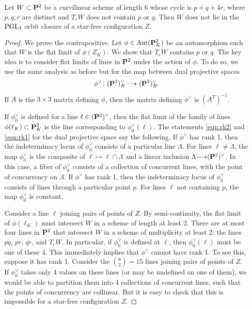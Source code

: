 \documentclass[12pt,reqno]{amsart}
\renewcommand{\to}{{\longrightarrow}}
\numberwithin{equation}{section}
\begin{document}
\begin{proposition}\label{prop:pq4r}
  Let $W \subset \P^2$ be a curvilinear scheme of length 6 whose cycle is $p + q + 4r$, where $p,q,r$ are distinct and $T_rW$ does not contain $p$ or $q$.
  Then $W$ does not lie in the $\PGL_3$ orbit closure of a star-free configuration $Z$.
\end{proposition}
\begin{proof}
  We prove the contrapositive.
  Let $\phi \in \Aut(\P^2_K)$ be an automorphism such that $W$ is the flat limit of $\phi(Z_K)$.
  We show that $T_r W$ contains $p$ or $q$.
  The key idea is to consider flat limits of lines in $\P^2$ under the action of $\phi$.
  To do so, we use the same analysis as before but for the map between dual projective spaces
  \[\phi^\vee \colon (\P^2)_R^\vee \dashrightarrow (\P^2)_R^\vee.\]
  If $A$ is the $3 \times 3$ matrix defining $\phi$, then the matrix defining $\phi^\vee$ is $(A^T)^{-1}$.

  If $\phi_0^\vee$ is defined for a line $\ell \in (\P^2)^\vee$, then the flat limit of the family of lines $\phi(\ell_K) \subset \P^2_K$ is the line corresponding to $\phi_0^\vee(\ell)$.
  The statements \eqref{eqn:rk2} and \eqref{eqn:rk1} for the dual projective space say the following.
  If $\phi^\vee$ has rank 1, then the indeterminacy locus of $\phi^\vee_0$ consists of a particular line $\Lambda$.
  For lines $\ell \neq \Lambda$, the map $\phi_0^\vee$ is the composite of $\ell \mapsto \ell \cap \Lambda$ and a linear inclusion $\Lambda \to (\P^2)^\vee$.
  In this case, a fiber of $\phi_0^\vee$ consists of a collection of concurrent lines, with the point of concurrency on $\Lambda$.
  If $\phi^\vee$ has rank 1, then the indeterminacy locus of $\phi^\vee_0$ consists of lines through a particular point $p$.
  For lines $\ell$ not containing $p$, the map $\phi_0^\vee$ is constant.

  Consider a line $\ell$ joining pairs of points of $Z$.
  By semi-continuity, the flat limit of $\phi(\ell_K)$ must intersect $W$ in a scheme of length at least 2.
  There are at most four lines in $\P^2$ that intersect $W$ in a scheme of multiplicity at least 2: the lines $\overline{pq}$, $\overline{pr}$, $\overline{qr}$, and $T_rW$.
  In particular, if $\phi_0^\vee$ is defined at $\ell$, then $\phi_0^\vee(\ell)$ must be one of these 4.
  This immediately implies that $\phi^\vee$ cannot have rank 1.
  To see this, suppose it has rank 1.
  Consider the ${6 \choose  2} = 15$ lines joining pairs of points of $Z$.
  If $\phi_0^\vee$ takes only 4 values on these lines (or may be undefined on one of them), we would be able to partition them into 4 collections of concurrent lines, such that the points of concurrency are collinear.
  But it is easy to check that this is impossible for a star-free configuration $Z$.


\end{proof}
\end{document}
